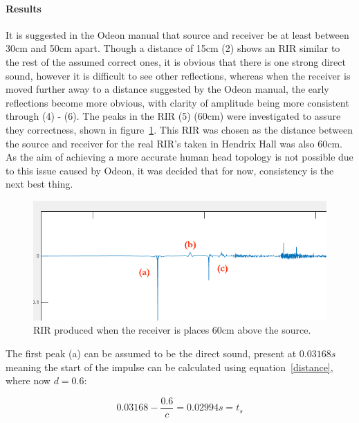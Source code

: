 \documentclass[../../main.tex]{subfiles}
\begin{document}
			\paragraph{Results}
			\label{odeon:results}

			It is suggested in the Odeon manual that source and receiver be at least between 30cm and 50cm apart. Though a distance of 15cm (2) shows an \ac{RIR} similar to the rest of the assumed correct ones, it is obvious that there is one strong direct sound, however it is difficult to see other reflections, whereas when the receiver is moved further away to a distance suggested by the Odeon manual, the early reflections become more obvious, with clarity of amplitude being more consistent through (4) - (6). The peaks in the RIR (5) (60cm) were investigated to assure they correctness, shown in figure~\ref{60cm}. This \ac{RIR} was chosen as the distance between the source and receiver for the real RIR’s taken in Hendrix Hall was also 60cm. As the aim of achieving a more accurate human head topology is not possible due to this issue caused by Odeon, it was decided that for now, consistency is the next best thing.

			\begin{figure}[H]
				\centerline{\includegraphics[scale = 0.6]{Sections/Implementation/Odeon/images/incorrectRIR/76_60cm_editV2_crop.png}}
				\caption{\ac{RIR} produced when the receiver is places 60cm above the source.}
				\label{60cm}
			\end{figure}

			The first peak (a) can be assumed to be the direct sound, present at $0.03168s$ meaning the start of the impulse can be calculated using equation~\ref{distance}, where now $d = 0.6$:

			\begin{equation}
			0.03168 - \frac{0.6}{c} = 0.02994s = t_s
			\end{equation}
\end{document}
